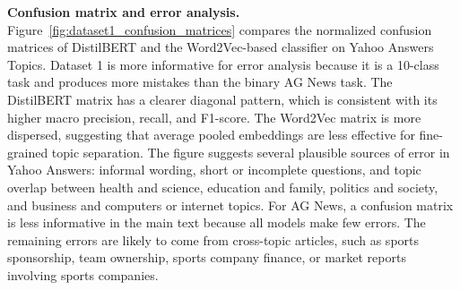 \textbf{Confusion matrix and error analysis.}
Figure~\ref{fig:dataset1_confusion_matrices} compares the normalized confusion matrices of DistilBERT and the Word2Vec-based classifier on Yahoo Answers Topics. Dataset 1 is more informative for error analysis because it is a 10-class task and produces more mistakes than the binary AG News task. The DistilBERT matrix has a clearer diagonal pattern, which is consistent with its higher macro precision, recall, and F1-score. The Word2Vec matrix is more dispersed, suggesting that average pooled embeddings are less effective for fine-grained topic separation. The figure suggests several plausible sources of error in Yahoo Answers: informal wording, short or incomplete questions, and topic overlap between health and science, education and family, politics and society, and business and computers or internet topics. For AG News, a confusion matrix is less informative in the main text because all models make few errors. The remaining errors are likely to come from cross-topic articles, such as sports sponsorship, team ownership, sports company finance, or market reports involving sports companies.
